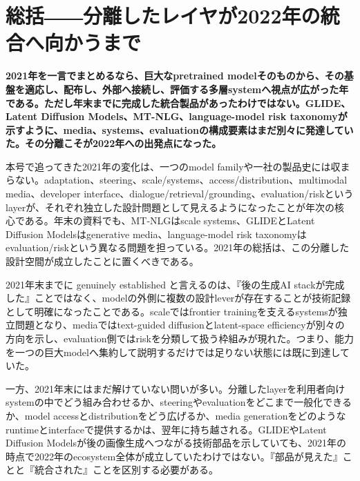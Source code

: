 \section{総括――分離したレイヤが2022年の統合へ向かうまで}
\noindent\textbf{2021年を一言でまとめるなら、巨大なpretrained modelそのものから、その基盤を適応し、配布し、外部へ接続し、評価する多層systemへ視点が広がった年である。ただし年末までに完成した統合製品があったわけではない。GLIDE、Latent Diffusion Models、MT-NLG、language-model risk taxonomyが示すように、media、systems、evaluationの構成要素はまだ別々に発達していた。その分離こそが2022年への出発点になった。}\autocite{src-20fd9bba2e7a,src-50244427230b,src-a4561c635fe6,src-b307b4b82867}

本号で追ってきた2021年の変化は、一つのmodel familyや一社の製品史には収まらない。adaptation、steering、scale/systems、access/distribution、multimodal media、developer interface、dialogue/retrieval/grounding、evaluation/riskというlayerが、それぞれ独立した設計問題として見えるようになったことが年次の核心である。年末の資料でも、MT-NLGはscale systems、GLIDEとLatent Diffusion Modelsはgenerative media、language-model risk taxonomyはevaluation/riskという異なる問題を担っている。2021年の総括は、この分離した設計空間が成立したことに置くべきである。\autocite{src-20fd9bba2e7a,src-50244427230b,src-a4561c635fe6,src-b307b4b82867}


2021年末までに genuinely established と言えるのは、『後の生成AI stackが完成した』ことではなく、modelの外側に複数の設計leverが存在することが技術記録として明確になったことである。scaleではfrontier trainingを支えるsystemsが独立問題となり、mediaではtext-guided diffusionとlatent-space efficiencyが別々の方向を示し、evaluation側ではriskを分類して扱う枠組みが現れた。つまり、能力を一つの巨大modelへ集約して説明するだけでは足りない状態には既に到達していた。\autocite{src-20fd9bba2e7a,src-50244427230b,src-a4561c635fe6,src-b307b4b82867}


一方、2021年末にはまだ解けていない問いが多い。分離したlayerを利用者向けsystemの中でどう組み合わせるか、steeringやevaluationをどこまで一般化できるか、model accessとdistributionをどう広げるか、media generationをどのようなruntimeとinterfaceで提供するかは、翌年に持ち越される。GLIDEやLatent Diffusion Modelsが後の画像生成へつながる技術部品を示していても、2021年の時点で2022年のecosystem全体が成立していたわけではない。『部品が見えた』ことと『統合された』ことを区別する必要がある。\autocite{src-50244427230b,src-a4561c635fe6}


